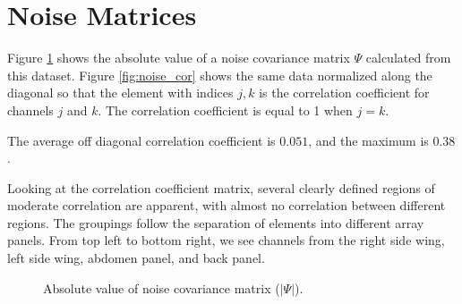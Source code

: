 \section{Noise Matrices}
Figure \ref{fig:noise_cov} shows the absolute value of a noise covariance matrix $\Psi$ calculated from this dataset.
Figure \ref{fig:noise_cor} shows the same data normalized along the diagonal so that the element with indices $j,k$ is
the correlation coefficient for channels $j$ and $k$. The correlation coefficient is equal to 1 when $j=k$.

The average off diagonal correlation coefficient is $0.051$, and the maximum is $0.38$.

Looking at the correlation coefficient matrix, several clearly defined regions of moderate correlation are apparent,
with almost no correlation between different regions. The groupings follow the separation of elements into different
array panels. From top left to bottom right, we see channels from the right side wing, left side wing,
abdomen panel, and back panel.

\begin{figure}
    \caption{Absolute value of noise covariance matrix ($|\Psi|$).}
\label{fig:noise_cov}
\end{figure}

